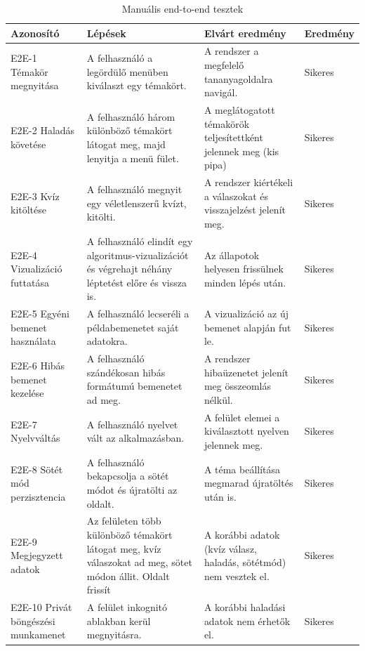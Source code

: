 \begin{table}[H] \centering \small \begin{tabularx}{\textwidth}{X X X X} \hline \textbf{Azonosító} & \textbf{Lépések} & \textbf{Elvárt eredmény} & 
    \textbf{Eredmény} \\ \hline 
    E2E-1 Témakör megnyitása & A felhasználó a legördülő menüben kiválaszt egy témakört. & A rendszer a megfelelő tananyagoldalra navigál. & Sikeres \\ \hline 
    E2E-2 Haladás követése & A felhasználó három különböző témakört látogat meg, majd lenyitja a menü fület. & A meglátogatott témakörök teljesítettként jelennek meg (kis pipa) & Sikeres \\ \hline 
    E2E-3 Kvíz kitöltése & A felhasználó megnyit egy véletlenszerű kvízt, kitölti. & A rendszer kiértékeli a válaszokat és visszajelzést jelenít meg. & Sikeres \\ \hline 
    E2E-4 Vizualizáció futtatása & A felhasználó elindít egy algoritmus-vizualizációt és végrehajt néhány léptetést előre és vissza is. & Az állapotok helyesen frissülnek minden lépés után. & Sikeres \\ \hline 
    E2E-5 Egyéni bemenet használata & A felhasználó lecseréli a példabemenetet saját adatokra. & A vizualizáció az új bemenet alapján fut le. & Sikeres \\ \hline 
    E2E-6 Hibás bemenet kezelése & A felhasználó szándékosan hibás formátumú bemenetet ad meg. & A rendszer hibaüzenetet jelenít meg összeomlás nélkül. & Sikeres \\ \hline 
    E2E-7 Nyelvváltás & A felhasználó nyelvet vált az alkalmazásban. & A felület elemei a kiválasztott nyelven jelennek meg. & Sikeres \\ \hline 
    E2E-8 Sötét mód perzisztencia & A felhasználó bekapcsolja a sötét módot és újratölti az oldalt. & A téma beállítása megmarad újratöltés után is. & Sikeres \\ \hline 
    E2E-9 Megjegyzett adatok & Az felületen több különböző témakört látogat meg, kvíz válaszokat ad meg, sötet módon állit. Oldalt frissít & A korábbi adatok (kvíz válasz, haladás, sötétmód) nem vesztek el. & Sikeres \\ \hline 
    E2E-10 Privát böngészési munkamenet & A felület inkognitó ablakban kerül megnyitásra. & A korábbi haladási adatok nem érhetők el. & Sikeres \\ \hline 

\end{tabularx} \caption{Manuális end-to-end tesztek} \label{tab:e2e-tests} \end{table}

